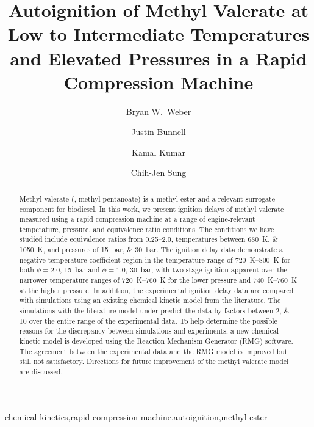 \documentclass[letterpaper, review]{elsarticle}
\begin{document}
\begin{frontmatter}
\title{ Autoignition of Methyl Valerate at Low to Intermediate Temperatures and Elevated Pressures in a Rapid Compression Machine }

\author[uconn]{Bryan W.\ Weber}
\author[uconn]{Justin Bunnell}
\author[idaho]{Kamal Kumar}
\author[uconn]{Chih-Jen Sung}
\address[uconn]{Department of Mechanical Engineering, University of Connecticut, Storrs, CT, USA}
\address[idaho]{Department of Mechanical Engineering, University of Idaho, Moscow, ID, USA}

\begin{abstract} %
    Methyl valerate (, methyl pentanoate) is a methyl ester and a
    relevant surrogate component for biodiesel. In this work, we present
    ignition delays of methyl valerate measured using a rapid compression
    machine at a range of engine-relevant temperature, pressure, and equivalence
    ratio conditions. The conditions we have studied include equivalence ratios
    from \numrange{0.25}{2.0}, temperatures between \SIlist{680;1050}{\K}, and
    pressures of \SIlist{15;30}{\bar}. The ignition delay data demonstrate a
    negative temperature coefficient region in the temperature range of
    \SIrange[range-phrase={--}]{720}{800}{\K} for both \(\phi=2.0\),
    \SI{15}{\bar} and \(\phi=1.0\), \SI{30}{\bar}, with two-stage ignition
    apparent over the narrower temperature ranges of
    \SIrange[range-phrase={--}]{720}{760}{\K} for the lower pressure and
    \SIrange[range-phrase={--}]{740}{760}{\K} at the higher pressure. In
    addition, the experimental ignition delay data are compared with simulations
    using an existing chemical kinetic model from the literature. The
    simulations with the literature model under-predict the data by factors
    between \numlist{2;10} over the entire range of the experimental data. To
    help determine the possible reasons for the discrepancy between simulations
    and experiments, a new chemical kinetic model is developed using the
    Reaction Mechanism Generator (RMG) software. The agreement between the
    experimental data and the RMG model is improved but still not satisfactory.
    Directions for future improvement of the methyl valerate model are
    discussed.
\end{abstract}

\begin{keyword}
    chemical kinetics\sep rapid compression machine\sep autoignition\sep methyl ester
\end{keyword}
\end{frontmatter}
\end{document}
